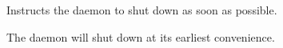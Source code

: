 
\begin{reqdesc}
Instructs the daemon to shut down as soon as possible.
\end{reqdesc}


\begin{responses}
  The daemon will shut down at its earliest convenience.
\end{responses}
